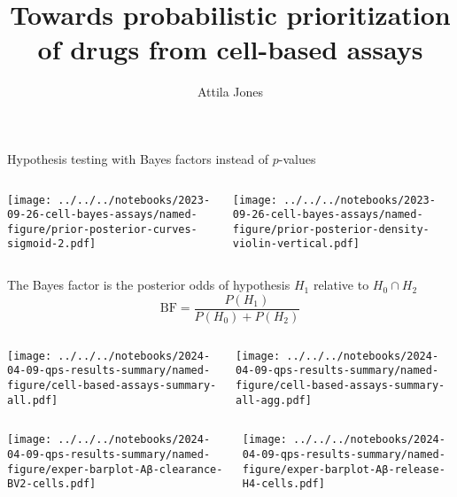 \documentclass[aspectratio=169]{beamer}
\title{Towards probabilistic prioritization of drugs from cell-based assays}
\subtitle{}
\author{Attila Jones}
\date{}
\begin{document}
\titlepage

\begin{frame}{Hypothesis testing with Bayes factors instead of $p$-values}
\begin{columns}[t]
\begin{column}{0.5\textwidth}

  \texttt{[image: ../../../notebooks/2023-09-26-cell-bayes-assays/named-figure/prior-posterior-curves-sigmoid-2.pdf]}
\end{column}

\begin{column}{0.5\textwidth}

  \texttt{[image: ../../../notebooks/2023-09-26-cell-bayes-assays/named-figure/prior-posterior-density-violin-vertical.pdf]}
\end{column}
\end{columns}
The Bayes factor is the posterior odds of hypothesis $H_1$ relative to $H_0 \cap H_2$
\begin{equation}
  \mathrm{BF} = \frac{P(H_1)}{P(H_0) + P(H_2)}
\end{equation}
\end{frame}



\begin{frame}[plain]
\begin{columns}[t]
\begin{column}{0.6\textwidth}

  \texttt{[image: ../../../notebooks/2024-04-09-qps-results-summary/named-figure/cell-based-assays-summary-all.pdf]}
\end{column}

\begin{column}{0.4\textwidth}

  \texttt{[image: ../../../notebooks/2024-04-09-qps-results-summary/named-figure/cell-based-assays-summary-all-agg.pdf]}
\end{column}
\end{columns}
\end{frame}

\begin{frame}
\begin{columns}[t]
\begin{column}{0.5\textwidth}

  \texttt{[image: ../../../notebooks/2024-04-09-qps-results-summary/named-figure/exper-barplot-Aβ-clearance-BV2-cells.pdf]}
\end{column}

\begin{column}{0.5\textwidth}

  \texttt{[image: ../../../notebooks/2024-04-09-qps-results-summary/named-figure/exper-barplot-Aβ-release-H4-cells.pdf]}
\end{column}
\end{columns}
\end{frame}
\end{document}
